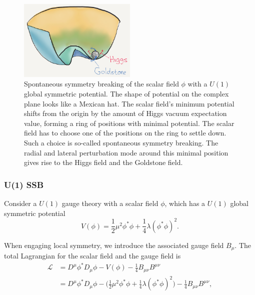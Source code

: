 \begin{figure}[ht]
    \centering
    \includegraphics[width=0.5\textwidth]{chapters/RelatedWorks/sectionQFT/figures/Higgs.png}
    \caption{Spontaneous symmetry breaking of the scalar field $\phi$  with a $U(1)$  global symmetric potential. The shape of potential on the complex plane looks like a Mexican hat. The scalar field's minimum potential shifts from the origin by the amount of Higgs vacuum expectation value, forming a ring of positions with minimal potential. The scalar field has to choose one of the positions on the ring to settle down. Such a choice is so-called spontaneous symmetry breaking. The radial and lateral perturbation mode around this minimal position gives rise to the Higgs field and the Goldstone field. }
    \label{fig:relatedWorks:qft:higgsPotential}
\end{figure}



\subsubsection{U(1) SSB}

Consider a $U(1)$ gauge theory with a scalar field $\phi$, which has a $U(1)$ global symmetric potential
\begin{equation}
    V(\phi) = \frac{1}{2} \mu^2 \phi^*\phi + \frac{1}{4}\lambda(\phi^*\phi )^2.
\end{equation}


\noindent When engaging local symmetry, we introduce the associated gauge field $B_{\mu}$. The total Lagrangian for the scalar field and the gauge field is
\begin{equation}
\begin{split}
	\mathcal{L} & = D^\mu\phi^* D_\mu\phi-V(\phi)   - \frac{1}{4}B_{\mu\nu}B^{\mu\nu} \\
	& = D^\mu\phi^* D_\mu\phi- \big(\frac{1}{2} \mu^2 \phi^*\phi + \frac{1}{4} \lambda(\phi^*\phi )^2 \big)   - \frac{1}{4}B_{\mu\nu}B^{\mu\nu},
\end{split}
\label{eqn:relatedWorks:qft:u1Higgs}
\end{equation}

